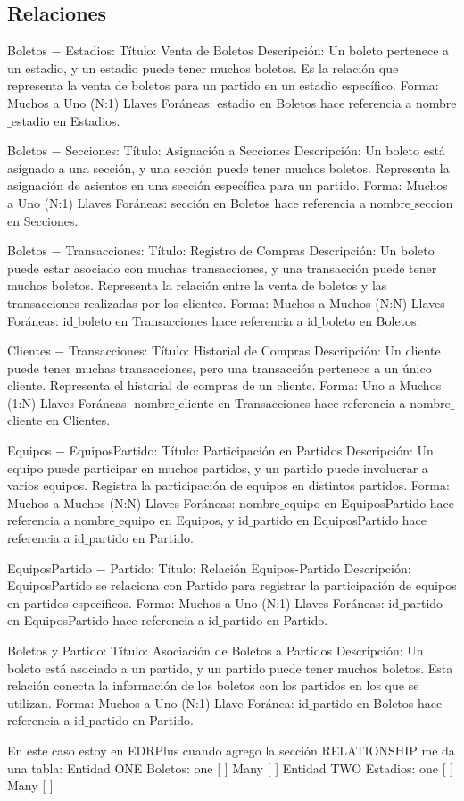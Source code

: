 \subsection*{Relaciones}

Boletos $-$ Estadios:
Título: Venta de Boletos
Descripción: Un boleto pertenece a un estadio, y un estadio puede tener muchos boletos. Es la relación que representa la venta de boletos para un partido en un estadio específico.
Forma: Muchos a Uno (N:1)
Llaves Foráneas: estadio en Boletos hace referencia a nombre$\_$estadio en Estadios.

Boletos $-$ Secciones:
Título: Asignación a Secciones
Descripción: Un boleto está asignado a una sección, y una sección puede tener muchos boletos. Representa la asignación de asientos en una sección específica para un partido.
Forma: Muchos a Uno (N:1)
Llaves Foráneas: sección en Boletos hace referencia a nombre$\_$seccion en Secciones.

Boletos $-$ Transacciones:
Título: Registro de Compras
Descripción: Un boleto puede estar asociado con muchas transacciones, y una transacción puede tener muchos boletos. Representa la relación entre la venta de boletos y las transacciones realizadas por los clientes.
Forma: Muchos a Muchos (N:N)
Llaves Foráneas: id$\_$boleto en Transacciones hace referencia a id$\_$boleto en Boletos.

Clientes $-$ Transacciones:
Título: Historial de Compras
Descripción: Un cliente puede tener muchas transacciones, pero una transacción pertenece a un único cliente. Representa el historial de compras de un cliente.
Forma: Uno a Muchos (1:N)
Llaves Foráneas: nombre$\_$cliente en Transacciones hace referencia a nombre$\_$cliente en Clientes.

Equipos $-$ EquiposPartido:
Título: Participación en Partidos
Descripción: Un equipo puede participar en muchos partidos, y un partido puede involucrar a varios equipos. Registra la participación de equipos en distintos partidos.
Forma: Muchos a Muchos (N:N)
Llaves Foráneas: nombre$\_$equipo en EquiposPartido hace referencia a nombre$\_$equipo en Equipos, y id$\_$partido en EquiposPartido hace referencia a id$\_$partido en Partido.


EquiposPartido $-$ Partido:
Título: Relación Equipos-Partido
Descripción: EquiposPartido se relaciona con Partido para registrar la participación de equipos en partidos específicos.
Forma: Muchos a Uno (N:1)
Llaves Foráneas: id$\_$partido en EquiposPartido hace referencia a id$\_$partido en Partido.


Boletos y Partido:
Título: Asociación de Boletos a Partidos
Descripción: Un boleto está asociado a un partido, y un partido puede tener muchos boletos. Esta relación conecta la información de los boletos con los partidos en los que se utilizan.
Forma: Muchos a Uno (N:1)
Llave Foránea: id$\_$partido en Boletos hace referencia a id$\_$partido en Partido.





En este caso estoy en EDRPlus 
cuando agrego la sección RELATIONSHIP me da una tabla:
Entidad ONE
 Boletos: 
               one [ ]
               Many [ ]
Entidad TWO
 Estadios: 
               one [ ]
               Many [ ]

